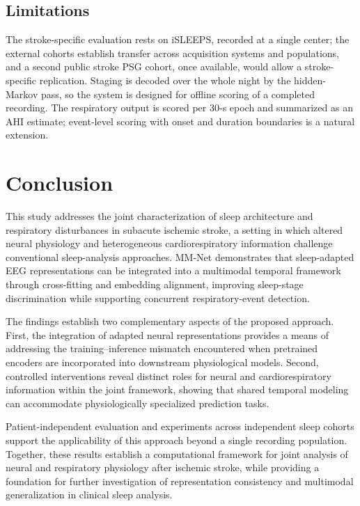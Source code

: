 \documentclass[a4paper,fleqn]{cas-sc}
\begin{document}
\subsection{Limitations}
The stroke-specific evaluation rests on iSLEEPS, recorded at a single center; the external cohorts
establish transfer across acquisition systems and populations, and a second public stroke PSG
cohort, once available, would allow a stroke-specific replication. Staging is decoded over the
whole night by the hidden-Markov pass, so the system is designed for offline scoring of a
completed recording. The respiratory output is scored per $30$-s epoch and summarized as an AHI
estimate; event-level scoring with onset and duration boundaries is a natural extension.


\section{Conclusion}

This study addresses the joint characterization of sleep architecture and respiratory disturbances in subacute ischemic stroke, a setting in which altered neural physiology and heterogeneous cardiorespiratory information challenge conventional sleep-analysis approaches. MM-Net demonstrates that sleep-adapted EEG representations can be integrated into a multimodal temporal framework through cross-fitting and embedding alignment, improving sleep-stage discrimination while supporting concurrent respiratory-event detection.

The findings establish two complementary aspects of the proposed approach. First, the integration of adapted neural representations provides a means of addressing the training--inference mismatch encountered when pretrained encoders are incorporated into downstream physiological models. Second, controlled interventions reveal distinct roles for neural and cardiorespiratory information within the joint framework, showing that shared temporal modeling can accommodate physiologically specialized prediction tasks.

Patient-independent evaluation and experiments across independent sleep cohorts support the applicability of this approach beyond a single recording population. Together, these results establish a computational framework for joint analysis of neural and respiratory physiology after ischemic stroke, while providing a foundation for further investigation of representation consistency and multimodal generalization in clinical sleep analysis.
\end{document}
